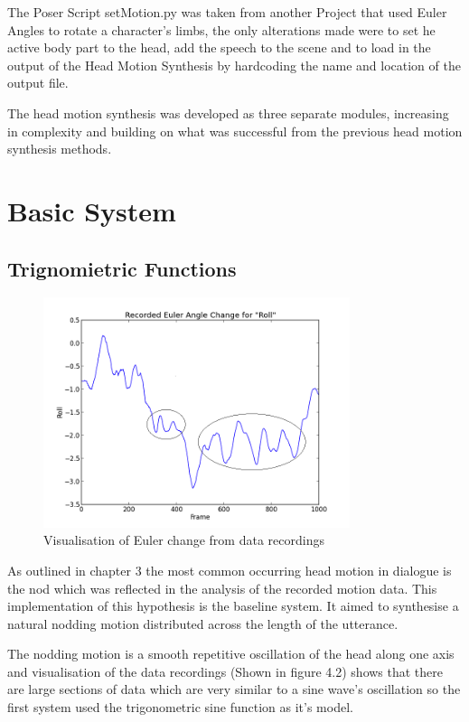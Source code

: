 \documentclass[bsc,frontabs,twoside,singlespacing,parskip]{infthesis}
\begin{document}
The Poser Script setMotion.py was taken from another Project that used Euler Angles to rotate a character's limbs, the only alterations made were to set he active body part to the head, add the speech to the scene and to load in the output of the Head Motion Synthesis by hardcoding the name and location of the output file.

The head motion synthesis was developed as three separate modules, increasing in complexity and building on what was successful from the previous head motion synthesis methods.

\section{Basic System} 

\subsection{Trignomietric Functions}

\begin{figure}
	\centering
	\includegraphics[width=0.8\textwidth]{euler_change.png}
	\caption{Visualisation of Euler change from data recordings}
\end{figure}

As outlined in chapter 3 the most common occurring head motion in dialogue is the nod which was reflected in the analysis of the recorded motion data. This implementation of this hypothesis is the baseline system. It aimed to synthesise a natural nodding motion distributed across the length of the utterance.

The nodding motion is a smooth repetitive oscillation of the head along one axis and visualisation of the data recordings (Shown in figure 4.2) shows that there are large sections of data which are very similar to a sine wave's oscillation so the first system used the trigonometric sine function as it's model.
\end{document}
